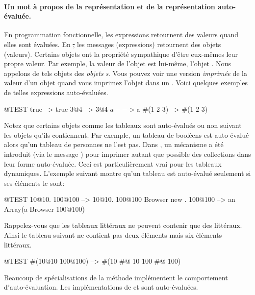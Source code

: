 \documentclass[a4paper,10pt,twoside]{book}
\begin{document}
\paragraph{Un mot \`a propos de la repr\'esentation et de la repr\'esentation auto-\'evalu\'ee.}
En programmation fonctionnelle, les expressions retournent des valeurs
quand elles sont \'evalu\'ees. En \st, les messages (expressions)
retournent des objets (valeurs). Certains objets ont la propri\'et\'e
sympathique d'\^etre eux-m\^emes leur propre valeur. Par exemple, la
valeur de l'objet  est lui-m\^eme, \ie l'objet
. Nous appelons de tels objets des \emph{objets}
\emph{s}. 
Vous pouvez voir une version  \emph{imprimée} de la valeur d'un objet quand vous imprimez l'objet dans un . Voici quelques exemples de telles expressions auto-\'evalu\'ees. 

\begin{code}{@TEST}
true     --> true
3@4      --> 3@4
$a       --> $a
#(1 2 3) --> #(1 2 3)
\end{code}

Notez que certains objets comme les tableaux sont auto-\'evalu\'es ou
non suivant les objets qu'ils contiennent. Par exemple, un tableau de
bool\'eens est auto-\'evalu\'e alors qu'un tableau de personnes ne
l'est pas. Dans , un m\'ecanisme a \'et\'e introduit (via le
message ) pour imprimer autant que
possible des collections dans leur forme auto-\'evalu\'ee. Ceci est
particuli\`erement vrai pour les tableaux dynamiques. L'exemple
suivant montre qu'un tableau  est auto-\'evalu\'e seulement si ses \'el\'ements le sont:
\begin{code}{@TEST}
{10@10. 100@100}          --> {10@10. 100@100}
{Browser new . 100@100}    --> an Array(a Browser 100@100)
\end{code}

Rappelez-vous que les tableaux littéraux ne peuvent contenir que des litt\'eraux. Ainsi le tableau suivant ne contient pas deux \'el\'ements mais six \'el\'ements litt\'eraux.
\begin{code}{@TEST}
#(10@10 100@100) --> #(10 #@ 10 100 #@ 100)
\end{code}

Beaucoup de sp\'ecialisations de la m\'ethode  impl\'ementent le comportement d'auto-\'evaluation. Les impl\'ementations de  et  sont auto-\'evalu\'ees.
\end{document}
